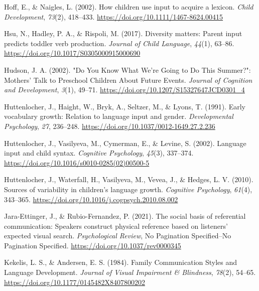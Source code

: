 \documentclass[
  man,floatsintext]{apa6}
\newlength{\cslhangindent}
\newlength{\cslentryspacingunit} %
\newenvironment{CSLReferences}[2] %
 {%
  \setlength{\parindent}{0pt}
  \ifodd #1
  \let\oldpar\par
  \def\par{\hangindent=\cslhangindent\oldpar}
  \fi
  \setlength{\parskip}{#2\cslentryspacingunit}
 }%
 {}
\begin{document}
\begin{CSLReferences}{1}{0}
\leavevmode{}%
Hoff, E., \& Naigles, L. (2002). How children use input to acquire a lexicon. \emph{Child Development}, \emph{73}(2), 418--433. \url{https://doi.org/10.1111/1467-8624.00415}

\leavevmode{}%
Hsu, N., Hadley, P. A., \& Rispoli, M. (2017). Diversity matters: Parent input predicts toddler verb production. \emph{Journal of Child Language}, \emph{44}(1), 63--86. \url{https://doi.org/10.1017/S0305000915000690}

\leavevmode{}%
Hudson, J. A. (2002). "{Do You Know What We}'re {Going} to {Do This Summer}?": {Mothers}' {Talk} to {Preschool Children About Future Events}. \emph{Journal of Cognition and Development}, \emph{3}(1), 49--71. \url{https://doi.org/10.1207/S15327647JCD0301_4}

\leavevmode{}%
Huttenlocher, J., Haight, W., Bryk, A., Seltzer, M., \& Lyons, T. (1991). Early vocabulary growth: {Relation} to language input and gender. \emph{Developmental Psychology}, \emph{27}, 236--248. \url{https://doi.org/10.1037/0012-1649.27.2.236}

\leavevmode{}%
Huttenlocher, J., Vasilyeva, M., Cymerman, E., \& Levine, S. (2002). Language input and child syntax. \emph{Cognitive Psychology}, \emph{45}(3), 337--374. \url{https://doi.org/10.1016/s0010-0285(02)00500-5}

\leavevmode{}%
Huttenlocher, J., Waterfall, H., Vasilyeva, M., Vevea, J., \& Hedges, L. V. (2010). Sources of variability in children's language growth. \emph{Cognitive Psychology}, \emph{61}(4), 343--365. \url{https://doi.org/10.1016/j.cogpsych.2010.08.002}

\leavevmode{}%
Jara-Ettinger, J., \& Rubio-Fernandez, P. (2021). The social basis of referential communication: {Speakers} construct physical reference based on listeners' expected visual search. \emph{Psychological Review}, No Pagination Specified--No Pagination Specified. \url{https://doi.org/10.1037/rev0000345}

\leavevmode{}%
Kekelis, L. S., \& Andersen, E. S. (1984). Family {Communication Styles} and {Language Development}. \emph{Journal of Visual Impairment \& Blindness}, \emph{78}(2), 54--65. \url{https://doi.org/10.1177/0145482X8407800202}


\end{CSLReferences}
\end{document}
